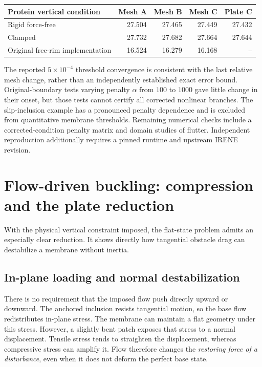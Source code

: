 \par\medskip\noindent\begin{minipage}{\linewidth}\centering\small
\begin{tabular}{lrrrr}\toprule Protein vertical condition & Mesh A & Mesh B & Mesh C & Plate C\\\midrule
Rigid force-free &27.504&27.465&27.449&27.432\\
Clamped &27.732&27.682&27.664&27.644\\
Original free-rim implementation &16.524&16.279&16.168&--\\\bottomrule
\end{tabular}
\end{minipage}\par\medskip
The reported $5\times10^{-4}$ threshold convergence is consistent with the last relative mesh change, rather than an independently established exact error bound. Original-boundary tests varying penalty $\alpha$ from $100$ to $1000$ gave little change in their onset, but those tests cannot certify all corrected nonlinear branches. The slip-inclusion  example has a pronounced penalty dependence and is excluded from quantitative membrane thresholds. Remaining numerical checks include a corrected-condition penalty matrix and domain studies of flutter. Independent reproduction additionally requires a pinned runtime and upstream IRENE revision.




\section{Flow-driven buckling: compression and the plate reduction}\label{sec:buckling}
With the physical vertical constraint imposed, the flat-state problem admits an especially clear reduction. It shows directly how tangential obstacle drag can destabilize a membrane without inertia.


\subsection{In-plane loading and normal destabilization}
There is no requirement that the imposed flow push directly upward or downward. The anchored inclusion resists tangential motion, so the base flow redistributes in-plane stress. The membrane can maintain a flat geometry under this stress. However, a slightly bent patch exposes that stress to a normal displacement. Tensile stress tends to straighten the displacement, whereas compressive stress can amplify it. Flow therefore changes the \emph{restoring force of a disturbance}, even when it does not deform the perfect base state.

